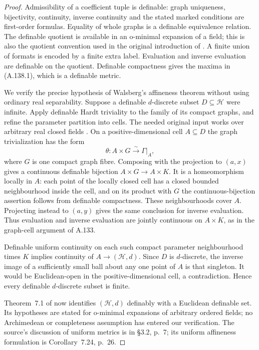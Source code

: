 \begin{proof}
Admissibility of a coefficient tuple is definable: graph uniqueness,
bijectivity, continuity, inverse continuity and the stated marked
conditions are first-order formulas. Equality of whole graphs is a
definable equivalence relation. The definable quotient is available
in an o-minimal expansion of a field; this is also the quotient
convention used in the original introduction of
\cite[p.~1]{Walsberg2015}. A finite union of formats is encoded by
a finite extra label. Evaluation and inverse evaluation are
definable on the quotient. Definable compactness gives the maxima
in (A.138.1), which is a definable metric.

We verify the precise hypothesis of Walsberg's affineness theorem
without using ordinary real separability. Suppose a definable
$d$-discrete subset $D\subseteq\mathcal H$ were infinite. Apply
definable Hardt triviality to the family of its compact graphs,
and refine the parameter partition into cells. The needed original
input works over arbitrary real closed fields
\cite[\S1.3 and Theorem~5.22, pp.~62--63]{Coste1999}.
On a positive-dimensional cell $A\subseteq D$ the graph
trivialization has the form
\[
 \theta:A\times G\xrightarrow{\sim}\Gamma|_A,
                                                        \tag{A.138.4}
\]
where $G$ is one compact graph fibre. Composing with the projection
to $(a,x)$ gives a continuous definable bijection
$A\times G\to A\times K$. It is a homeomorphism locally in $A$:
each point of the locally closed cell has a closed bounded
neighbourhood inside the cell, and on its product with $G$ the
continuous-bijection assertion follows from definable compactness.
These neighbourhoods cover $A$. Projecting instead to $(a,y)$
gives the same conclusion for inverse evaluation. Thus evaluation
and inverse evaluation are jointly continuous on $A\times K$,
as in the graph-cell argument of A.133.

Definable uniform continuity on each such compact parameter
neighbourhood times $K$ implies continuity of
$A\to(\mathcal H,d)$. Since $D$ is $d$-discrete, the inverse
image of a sufficiently small ball about any one point of $A$
is that singleton. It would be Euclidean-open in the
positive-dimensional cell, a contradiction. Hence every definable
$d$-discrete subset is finite.

Theorem~7.1 of \cite[p.~16]{Walsberg2015} now identifies
$(\mathcal H,d)$ definably with a Euclidean definable set.
Its hypotheses are stated for o-minimal expansions of arbitrary
ordered fields; no Archimedean or completeness assumption has
entered our verification. The source's discussion of uniform
metrics is in \S3.2, p.~7; its uniform affineness formulation is
Corollary~7.24, p.~26.


\end{proof}
